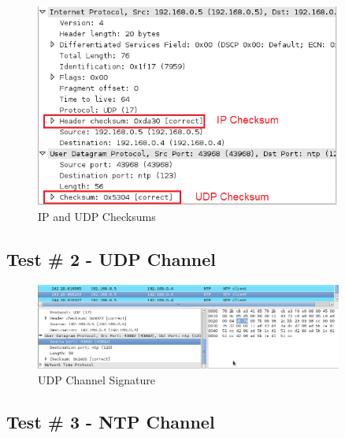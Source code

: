\documentclass[titlepage]{article}
\begin{document}
\begin{figure}[htb]                                                                       
  \begin{center}
    \includegraphics[width=0.9\textwidth]{Pictures/Checksum.png}
  \end{center}
  \caption{IP and UDP Checksums}
  \label{fig:checksums}
\end{figure}

\clearpage

\subsection{Test \# 2 - UDP Channel}

\begin{figure}[htb]                                                                       
  \begin{center}
    \includegraphics[width=0.9\textwidth]{Pictures/UDP_SIG.png}
  \end{center}
  \caption{UDP Channel Signature}
  \label{fig:udp_sig}
\end{figure}

\clearpage

\subsection{Test \# 3 - NTP Channel}
\end{document}
